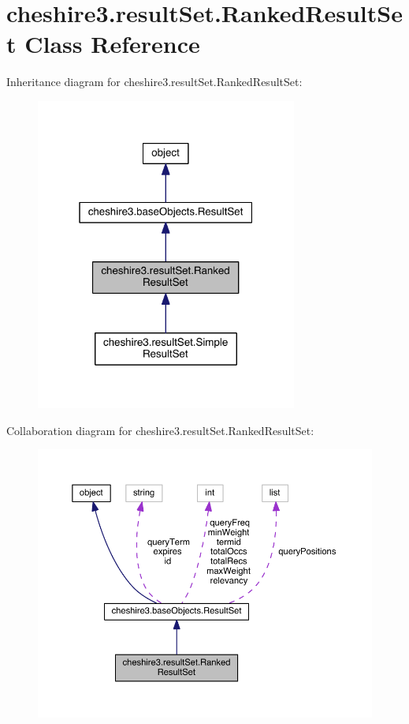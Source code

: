 \hypertarget{classcheshire3_1_1result_set_1_1_ranked_result_set}{\section{cheshire3.\-result\-Set.\-Ranked\-Result\-Set Class Reference}
\label{classcheshire3_1_1result_set_1_1_ranked_result_set}
}


Inheritance diagram for cheshire3.\-result\-Set.\-Ranked\-Result\-Set\-:
\nopagebreak
\begin{figure}[H]
\begin{center}
\leavevmode
\includegraphics[width=244pt]{classcheshire3_1_1result_set_1_1_ranked_result_set__inherit__graph}
\end{center}
\end{figure}


Collaboration diagram for cheshire3.\-result\-Set.\-Ranked\-Result\-Set\-:
\nopagebreak
\begin{figure}[H]
\begin{center}
\leavevmode
\includegraphics[width=350pt]{classcheshire3_1_1result_set_1_1_ranked_result_set__coll__graph}
\end{center}
\end{figure}
